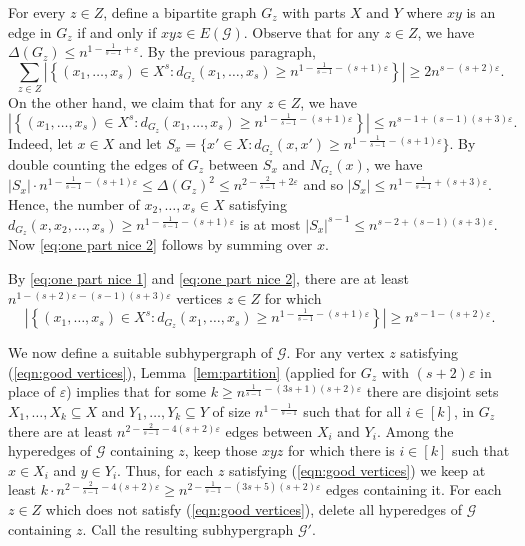 \documentclass[a4paper,11pt]{article}
\makeatletter
\renewenvironment{proof}[1][\proofname] {\par\pushQED{\qed}\normalfont\topsep6\p@\@plus6\p@\relax\trivlist\item[\hskip\labelsep\bfseries#1\@addpunct{.}]\ignorespaces}{\popQED\endtrivlist\@endpefalse}
\theoremstyle{definition}
\def\eps{\varepsilon}
\def\cG{\mathcal{G}}
\makeatother
\begin{document}
\begin{proof}
    For every $z\in Z$, define a bipartite graph $G_z$ with parts $X$ and $Y$ where $xy$ is an edge in $G_z$ if and only if $xyz\in E(\cG)$. Observe that for any $z\in Z$, we have $\Delta(G_z)\leq n^{1-\frac{1}{s-1}+\eps}$. By the previous paragraph,
    \begin{equation}\label{eq:one part nice 1}
    \sum_{z\in Z} \left| \left\{(x_1,\dots,x_s)\in X^s: d_{G_z}(x_1,\dots,x_s)\geq n^{1-\frac{1}{s-1}-(s+1)\eps} \right\}\right|\geq 2n^{s-(s+2)\eps}.
    \end{equation}
    On the other hand, we claim that for any $z\in Z$, we have 
    \begin{equation}\label{eq:one part nice 2}
    \left| \left\{(x_1,\dots,x_s)\in X^s: d_{G_z}(x_1,\dots,x_s)\geq n^{1-\frac{1}{s-1}-(s+1)\eps} \right\}\right|\leq n^{s-1+(s-1)(s+3)\eps}.
    \end{equation}
    Indeed, let $x \in X$ and let $S_x = \{x' \in X : d_{G_z}(x,x') \geq n^{1-\frac{1}{s-1}-(s+1)\varepsilon} \}$. By double counting the edges of $G_z$ between $S_x$ and $N_{G_z}(x)$, we have $|S_x| \cdot n^{1-\frac{1}{s-1}-(s+1)\varepsilon} \leq \Delta(G_z)^2 \leq n^{2-\frac{2}{s-1}+2\varepsilon}$ and so $|S_x| \leq n^{1-\frac{1}{s-1} + (s+3)\varepsilon}$. Hence, the number of $x_2,\dots,x_s \in X$ satisfying $d_{G_z}(x,x_2,\dots,x_s) \geq n^{1-\frac{1}{s-1}-(s+1)\varepsilon}$ is at most $|S_x|^{s-1} \leq n^{s-2 + (s-1)(s+3)\varepsilon}$. Now \eqref{eq:one part nice 2} follows by summing over $x$. 
    
    By \eqref{eq:one part nice 1} and \eqref{eq:one part nice 2}, there are at least $n^{1-(s+2)\eps-(s-1)(s+3)\eps}$ vertices $z\in Z$ for which
    \begin{equation}
        \left| \left\{(x_1,\dots,x_s)\in X^s: d_{G_z}(x_1,\dots,x_s)\geq n^{1-\frac{1}{s-1}-(s+1)\eps} \right\}\right|\geq n^{s-1-(s+2)\eps}. \label{eqn:good vertices}
    \end{equation}
    
    We now define a suitable subhypergraph of $\cG$.
    For any vertex $z$ satisfying (\ref{eqn:good vertices}), Lemma~\ref{lem:partition} (applied for $G_z$ with $(s+2)\eps$ in place of $\eps$) implies that for some $k \ge n^{\frac{1}{s-1}-(3s+1)(s+2)\eps}$ there are disjoint sets $X_1, \dots, X_k \subseteq X$ and $Y_1, \dots, Y_k \subseteq Y$ of size $n^{1-\frac{1}{s-1}}$ such that for all $i \in [k]$, in $G_z$ there are at least $n^{2-\frac{2}{s-1}-4(s+2)\varepsilon}$ edges between $X_i$ and $Y_i$. Among the hyperedges of $\cG$ containing $z$, keep those $xyz$ for which there is $i \in [k]$ such that $x\in X_i$ and $y\in Y_i$. Thus, for each $z$ satisfying (\ref{eqn:good vertices}) we keep at least $k \cdot n^{2-\frac{2}{s-1}-4(s+2)\varepsilon} \geq n^{2-\frac{1}{s-1} - (3s+5)(s+2)\varepsilon}$ edges containing it. For each $z\in Z$ which does not satisfy (\ref{eqn:good vertices}), delete all hyperedges of $\cG$ containing $z$. Call the resulting subhypergraph $\cG'$.
    

\end{proof}
\end{document}
